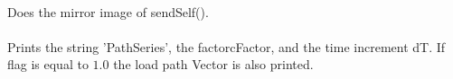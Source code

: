\\
Does the mirror image of sendSelf(). \\

\\
Prints the string 'PathSeries', the factor\p cFactor, and the time
increment \p dT. If \p flag is equal to $1.0$ the load path
Vector is also printed.


